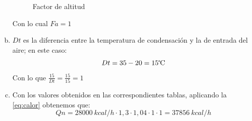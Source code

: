 \begin{enumerate}[a.]
\begin{figure}[H]
        \caption{Factor de altitud}
        \label{fig:Factor de altitud}
    \end{figure}
    Con lo cual $Fa = 1$
    \item $Dt$ es la diferencia entre la temperatura de condensaci\'on y la de entrada del aire; en este caso:
    \begin{equation*}
        Dt = 35 - 20 = 15 \text{\textcelsius}
    \end{equation*}
    Con lo que $\tfrac{15}{Dt} = \tfrac{15}{15} = 1$
    \item Con los valores obtenidos en las correspondientes tablas, aplicando la \ref{eq:calor} obtenemos que:
    \begin{equation*}
        Qn = 28000\ kcal/h \cdot 1,3 \cdot 1,04 \cdot 1 \cdot 1 = 37856\ kcal/h
    \end{equation*}
\end{enumerate}